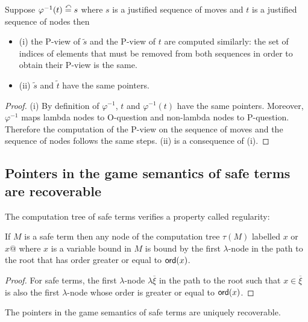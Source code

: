 \begin{property}
\label{proper:phi_pview}
Suppose $\varphi^{-1}(t) \stackrel{\curvearrowleft}{=} s$ where $s$ is a justified sequence of moves and
$t$ is a justified sequence of nodes then
\begin{itemize}
\item (i) the P-view of $\tilde{s}$ and the P-view of $t$ are computed
similarly: the set of indices of elements that must be removed from both sequences
in order to obtain their P-view is the same.
\item (ii) $\tilde{s}$ and $\tilde{t}$ have the same pointers.
\end{itemize}
\end{property}
\begin{proof}
(i) By definition of $\varphi^{-1}$, $t$ and $\varphi^{-1}(t)$ have the same pointers. Moreover,
$\varphi^{-1}$ maps lambda nodes to O-question and non-lambda nodes to P-question. Therefore the computation of the
P-view on the sequence of moves and the sequence of nodes follows the same steps.
(ii) is a consequence of (i).
\end{proof}

\subsection{Pointers in the game semantics of safe terms are recoverable}

The computation tree of safe terms verifies a property called regularity:
\begin{property}
\label{proper:regularity}
If $M$ is a safe term then any node of the computation tree $\tau(M)$ labelled $x$ or $x@$ where
$x$ is a variable bound in $M$ is bound by the first $\lambda$-node in the path to the root that has
order greater or equal to ${\sf ord}(x)$.
\end{property}
\begin{proof}
For safe terms, the first $\lambda$-node $\lambda \overline{\xi}$ in the path to the root such that
$x \in \overline{\xi}$ is also the first $\lambda$-node whose order is greater or equal to ${\sf ord}(x)$.
\end{proof}


\begin{prop}
The pointers in the game semantics of safe terms are
uniquely recoverable.
\end{prop}

